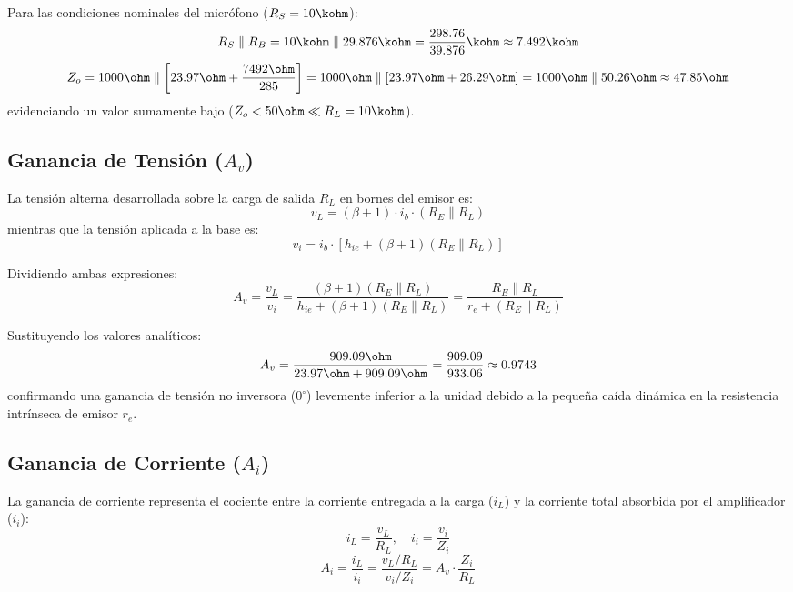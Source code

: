 Para las condiciones nominales del micrófono ($R_S = 10\kohm$):
\begin{equation}
  R_S \parallel R_B = 10\kohm \parallel 29.876\kohm = \frac{298.76}{39.876}\kohm \approx 7.492\kohm
\end{equation}
\begin{equation}
  Z_o = 1000\ohm \parallel \left[ 23.97\ohm + \frac{7492\ohm}{285} \right] = 1000\ohm \parallel [23.97\ohm + 26.29\ohm] = 1000\ohm \parallel 50.26\ohm \approx 47.85\ohm
  \label{eq:Zo_teorico}
\end{equation}
evidenciando un valor sumamente bajo ($Z_o < 50\ohm \ll R_L = 10\kohm$).

\subsection{Ganancia de Tensión (\texorpdfstring{$A_v$}{Av})}
La tensión alterna desarrollada sobre la carga de salida $R_L$ en bornes del emisor es:
\begin{equation}
  v_L = (\beta + 1) \cdot i_b \cdot (R_E \parallel R_L)
\end{equation}
mientras que la tensión aplicada a la base es:
\begin{equation}
  v_i = i_b \cdot \left[ h_{ie} + (\beta + 1)(R_E \parallel R_L) \right]
\end{equation}

Dividiendo ambas expresiones:
\begin{equation}
  A_v = \frac{v_L}{v_i} = \frac{(\beta + 1)(R_E \parallel R_L)}{h_{ie} + (\beta + 1)(R_E \parallel R_L)} = \frac{R_E \parallel R_L}{r_e + (R_E \parallel R_L)}
  \label{eq:Av_formula}
\end{equation}

Sustituyendo los valores analíticos:
\begin{equation}
  A_v = \frac{909.09\ohm}{23.97\ohm + 909.09\ohm} = \frac{909.09}{933.06} \approx 0.9743
  \label{eq:Av_teorica}
\end{equation}
confirmando una ganancia de tensión no inversora ($0^\circ$) levemente inferior a la unidad debido a la pequeña caída
dinámica en la resistencia intrínseca de emisor $r_e$.

\subsection{Ganancia de Corriente (\texorpdfstring{$A_i$}{Ai})}
La ganancia de corriente representa el cociente entre la corriente entregada a la carga ($i_L$) y la corriente total
absorbida por el amplificador ($i_i$):
\begin{equation}
  i_L = \frac{v_L}{R_L}, \quad i_i = \frac{v_i}{Z_i}
\end{equation}
\begin{equation}
  A_i = \frac{i_L}{i_i} = \frac{v_L / R_L}{v_i / Z_i} = A_v \cdot \frac{Z_i}{R_L}
  \label{eq:Ai_formula}
\end{equation}

